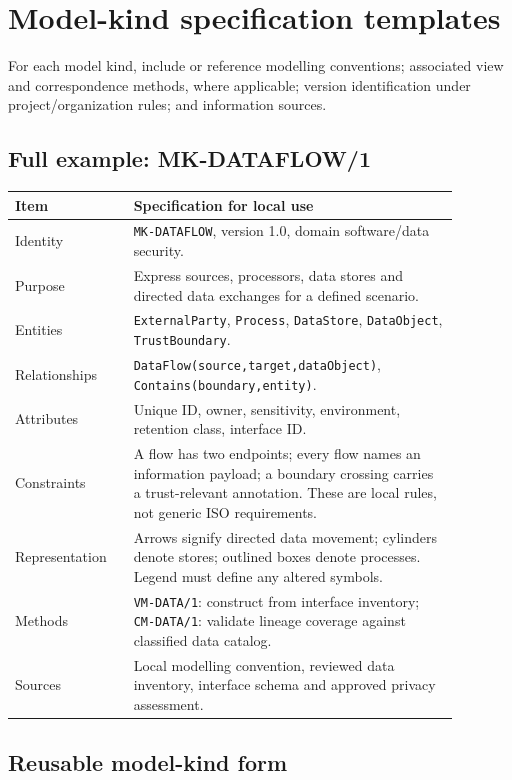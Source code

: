 \documentclass[11pt,letterpaper]{article}
\begin{document}
\section{Model-kind specification templates \texorpdfstring{}{(8.2)}}
\begin{Requirement}\FlagReq{} For each model kind, include or reference modelling conventions; associated view and correspondence methods, where applicable; version identification under project/organization rules; and information sources. \end{Requirement}
\subsection{Full example: MK-DATAFLOW/1}
\begin{longtable}{p{0.23\linewidth}p{0.65\linewidth}}\toprule\textbf{Item}&\textbf{Specification for local use}\\\midrule\endhead
Identity&\texttt{MK-DATAFLOW}, version 1.0, domain software/data security.\\
Purpose&Express sources, processors, data stores and directed data exchanges for a defined scenario.\\
Entities&\texttt{ExternalParty}, \texttt{Process}, \texttt{DataStore}, \texttt{DataObject}, \texttt{TrustBoundary}.\\
Relationships&\texttt{DataFlow(source,target,dataObject)}, \texttt{Contains(boundary,entity)}.\\
Attributes&Unique ID, owner, sensitivity, environment, retention class, interface ID.\\
Constraints&A flow has two endpoints; every flow names an information payload; a boundary crossing carries a trust-relevant annotation. These are \FlagImpl{} local rules, not generic ISO requirements.\\
Representation&Arrows signify directed data movement; cylinders denote stores; outlined boxes denote processes. Legend must define any altered symbols.\\
Methods&\texttt{VM-DATA/1}: construct from interface inventory; \texttt{CM-DATA/1}: validate lineage coverage against classified data catalog.\\
Sources&Local modelling convention, reviewed data inventory, interface schema and approved privacy assessment.\\\bottomrule\end{longtable}
\subsection{Reusable model-kind form}
\end{document}
